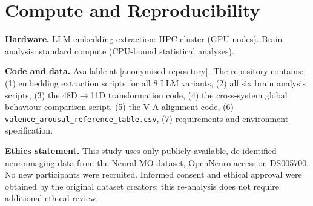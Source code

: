 \documentclass{article}
\begin{document}
\section{Compute and Reproducibility}
\label{app:compute}

\textbf{Hardware.}
LLM embedding extraction: HPC cluster (GPU nodes).
Brain analysis: standard compute (CPU-bound statistical analyses).

\textbf{Code and data.}
Available at [anonymised repository].
The repository contains:
(1) embedding extraction scripts for all 8 LLM variants,
(2) all six brain analysis scripts,
(3) the 48D$\to$11D transformation code,
(4) the cross-system global behaviour comparison script,
(5) the V-A alignment code,
(6) \texttt{valence\_arousal\_reference\_table.csv},
(7) requirements and environment specification.

\textbf{Ethics statement.}
This study uses only publicly available, de-identified neuroimaging data from the
Neural MO dataset, OpenNeuro accession DS005700.
No new participants were recruited.
Informed consent and ethical approval were obtained by the original dataset creators;
this re-analysis does not require additional ethical review.
\end{document}

